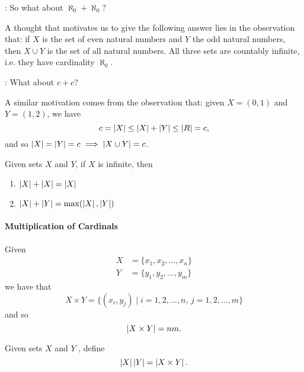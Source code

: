 \documentclass[notoc,notitlepage]{tufte-book}
\begin{document}
: So what about $\aleph_0 + \aleph_0$?

A thought that motivates us to give the following answer lies in the observation that: if $X$ is the set of even natural numbers and $Y$ the odd natural numbers, then $X \cup Y$ is the set of all natural numbers. All three sets are countably infinite, i.e. they have cardinality $\aleph_0$.

: What about $c + c$?

A similar motivation comes from the observation that: given $X = (0, 1)$ and $Y = (1, 2)$, we have
\begin{equation*}
  c = \left|X\right| \leq \left|X\right| + \left|Y\right| \leq \left|R\right| = c,
\end{equation*}
and so $\left|X\right| = \left|Y\right| = c \implies \left|X \cup Y\right| = c$.

\begin{thm}
\label{thm:sums_of_cardinals}
  Given sets $X$ and $Y$, if $X$ is infinite, then
  \begin{enumerate}
    \item $\left|X\right| + \left|X\right| = \left|X\right|$
    \item $\left|X\right| + \left|Y\right| = \max( \left|X\right|, \left|Y\right| )$
  \end{enumerate}
\end{thm} 

\paragraph{Multiplication of Cardinals} Given
\begin{align*}
  X &= \{ x_1, x_2, ..., x_n \} \\
  Y &= \{ y_1, y_2, ..., y_m \}
\end{align*}
we have that
\begin{equation*}
  X \times Y = \{ (x_i, y_j) \mid i = 1, 2, ..., n, \, j = 1, 2, ..., m \}
\end{equation*}
and so
\begin{equation*}
  \left|X \times Y\right| = nm.
\end{equation*}

\begin{defn}
\label{defn:multiplication_of_cardinals}
  Given sets $X$ and $Y$ , define
  \begin{equation*}
    \left|X\right| \left|Y\right| = \left|X \times Y\right|.
  \end{equation*}
\end{defn}
\end{document}
